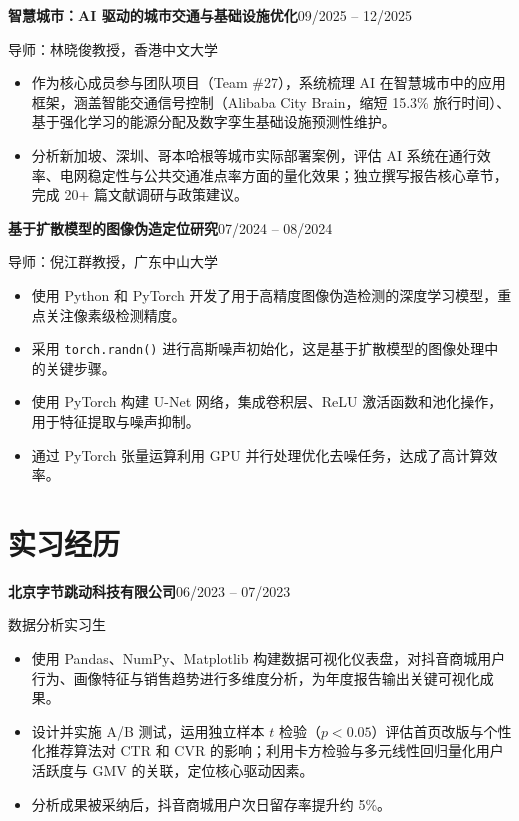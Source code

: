 \documentclass[a4paper,10pt]{article}
\newcommand{\entry}[2]{%
  \noindent\textbf{#1}\hfill#2\par%
}
\newcommand{\subline}[1]{%
  \noindent#1\par%
}
\begin{document}
\vspace{5pt}
\entry{智慧城市：AI 驱动的城市交通与基础设施优化}{09/2025 -- 12/2025}
\subline{导师：林晓俊教授，香港中文大学}
\begin{itemize}
  \item 作为核心成员参与团队项目（Team \#27），系统梳理 AI 在智慧城市中的应用框架，涵盖智能交通信号控制（Alibaba City Brain，缩短 15.3\% 旅行时间）、基于强化学习的能源分配及数字孪生基础设施预测性维护。
  \item 分析新加坡、深圳、哥本哈根等城市实际部署案例，评估 AI 系统在通行效率、电网稳定性与公共交通准点率方面的量化效果；独立撰写报告核心章节，完成 20+ 篇文献调研与政策建议。
\end{itemize}

\vspace{5pt}
\entry{基于扩散模型的图像伪造定位研究}{07/2024 -- 08/2024}
\subline{导师：倪江群教授，广东中山大学}
\begin{itemize}
  \item 使用 Python 和 PyTorch 开发了用于高精度图像伪造检测的深度学习模型，重点关注像素级检测精度。
  \item 采用 \texttt{torch.randn()} 进行高斯噪声初始化，这是基于扩散模型的图像处理中的关键步骤。
  \item 使用 PyTorch 构建 U-Net 网络，集成卷积层、ReLU 激活函数和池化操作，用于特征提取与噪声抑制。
  \item 通过 PyTorch 张量运算利用 GPU 并行处理优化去噪任务，达成了高计算效率。
\end{itemize}

\section*{实习经历}

\entry{北京字节跳动科技有限公司}{06/2023 -- 07/2023}
\subline{数据分析实习生}
\begin{itemize}
  \item 使用 Pandas、NumPy、Matplotlib 构建数据可视化仪表盘，对抖音商城用户行为、画像特征与销售趋势进行多维度分析，为年度报告输出关键可视化成果。
  \item 设计并实施 A/B 测试，运用独立样本 $t$ 检验（$p < 0.05$）评估首页改版与个性化推荐算法对 CTR 和 CVR 的影响；利用卡方检验与多元线性回归量化用户活跃度与 GMV 的关联，定位核心驱动因素。
  \item 分析成果被采纳后，抖音商城用户次日留存率提升约 5\%。
\end{itemize}
\end{document}
